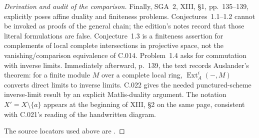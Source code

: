 \begin{proof}[Derivation and audit of the comparison]
Finally, SGA~2, XIII, \S1, pp.~135--139, explicitly poses
affine duality and finiteness problems. Conjectures~1.1--1.2
cannot be invoked as proofs of the general chain; the
edition's notes record that those literal formulations
are false. Conjecture~1.3 is a finiteness assertion for
complements of local complete intersections in projective
space, not the vanishing/comparison equivalence of C.014.
Problem~1.4 asks for commutation with inverse limits.
Immediately afterward, p.~139, the text records Auslander's
theorem: for a finite module $M$ over a complete local ring,
$\operatorname{Ext}^i_A(-,M)$ converts direct limits to
inverse limits. C.022 gives the needed punctured-scheme
inverse-limit result by an explicit Matlis-duality argument.
The notation $X'=X\setminus\{a\}$ appears at the beginning
of XIII, \S2 on the same page, consistent with C.021's
reading of the handwritten diagram.

The source locators used above are \cite{C-sga2,C-hartshorne1970,C-hartshorne1971,C-speiser1973}.
\end{proof}
